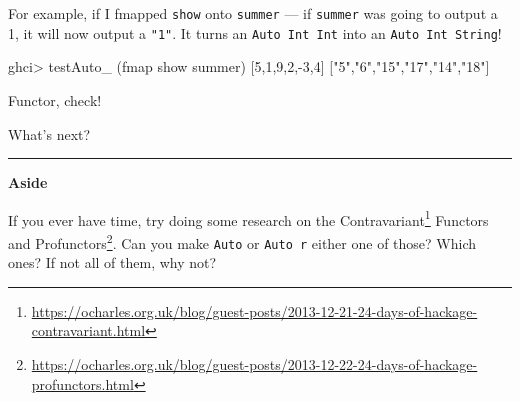 \documentclass[]{article}
\newenvironment{Shaded}{}{}
\newcommand{\CommentTok}[1]{\textcolor[rgb]{0.38,0.63,0.69}{\textit{#1}}}
\newcommand{\DataTypeTok}[1]{\textcolor[rgb]{0.56,0.13,0.00}{#1}}
\newcommand{\DecValTok}[1]{\textcolor[rgb]{0.25,0.63,0.44}{#1}}
\newcommand{\FunctionTok}[1]{\textcolor[rgb]{0.02,0.16,0.49}{#1}}
\newcommand{\KeywordTok}[1]{\textcolor[rgb]{0.00,0.44,0.13}{\textbf{#1}}}
\newcommand{\NormalTok}[1]{#1}
\newcommand{\OperatorTok}[1]{\textcolor[rgb]{0.40,0.40,0.40}{#1}}
\newcommand{\OtherTok}[1]{\textcolor[rgb]{0.00,0.44,0.13}{#1}}
\newcommand{\StringTok}[1]{\textcolor[rgb]{0.25,0.44,0.63}{#1}}
\renewcommand{\href}[2]{#2\footnote{\url{#1}}}
\begin{document}
For example, if I fmapped \texttt{show} onto \texttt{summer} --- if
\texttt{summer} was going to output a 1, it will now output a \texttt{"1"}. It
turns an \texttt{Auto\ Int\ Int} into an \texttt{Auto\ Int\ String}!

\begin{Shaded}
\end{Shaded}

\begin{Shaded}
\begin{Highlighting}[]
\NormalTok{ghci}\OperatorTok{\textgreater{}}\NormalTok{ testAuto\_ (}\FunctionTok{fmap} \FunctionTok{show}\NormalTok{ summer) [}\DecValTok{5}\NormalTok{,}\DecValTok{1}\NormalTok{,}\DecValTok{9}\NormalTok{,}\DecValTok{2}\NormalTok{,}\OperatorTok{{-}}\DecValTok{3}\NormalTok{,}\DecValTok{4}\NormalTok{]}
\NormalTok{[}\StringTok{"5"}\NormalTok{,}\StringTok{"6"}\NormalTok{,}\StringTok{"15"}\NormalTok{,}\StringTok{"17"}\NormalTok{,}\StringTok{"14"}\NormalTok{,}\StringTok{"18"}\NormalTok{]}
\end{Highlighting}
\end{Shaded}

Functor, check!

What's next?

\begin{center}\rule{0.5\linewidth}{0.5pt}\end{center}

\textbf{Aside}

If you ever have time, try doing some research on the
\href{https://ocharles.org.uk/blog/guest-posts/2013-12-21-24-days-of-hackage-contravariant.html}{Contravariant}
Functors and
\href{https://ocharles.org.uk/blog/guest-posts/2013-12-22-24-days-of-hackage-profunctors.html}{Profunctors}.
Can you make \texttt{Auto} or \texttt{Auto\ r} either one of those? Which ones?
If not all of them, why not?
\end{document}
